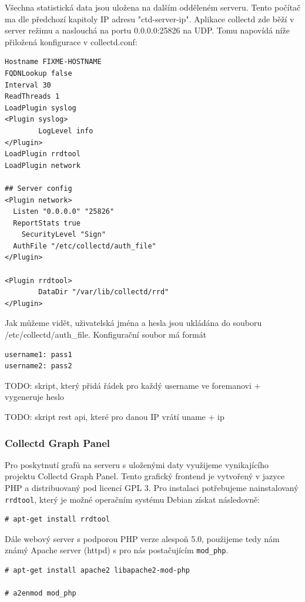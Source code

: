 \documentclass[thesis=B,czech]{FITthesis}[2012/06/26]
\begin{document}
Všechna statistická data jsou uložena na dalším odděleném serveru. Tento počítač ma dle předchozí kapitoly IP adresu "ctd-server-ip". Aplikace collectd zde běží v server režimu a naslouchá na portu 0.0.0.0:25826 na UDP. Tomu napovídá níže přiložená konfigurace v collectd.conf:

\begin{verbatim}
Hostname FIXME-HOSTNAME
FQDNLookup false
Interval 30
ReadThreads 1
LoadPlugin syslog
<Plugin syslog>
        LogLevel info
</Plugin>
LoadPlugin rrdtool
LoadPlugin network

## Server config
<Plugin network>
  Listen "0.0.0.0" "25826"
  ReportStats true
	SecurityLevel "Sign"
  AuthFile "/etc/collectd/auth_file"
</Plugin>

<Plugin rrdtool>
        DataDir "/var/lib/collectd/rrd"
</Plugin>
\end{verbatim}

Jak můžeme vidět, uživatelská jména a hesla jsou ukládána do souboru /etc/collectd/auth\_file. Konfigurační soubor má formát

\begin{verbatim}
username1: pass1
username2: pass2
\end{verbatim}

TODO: skript, který přidá řádek pro každý username ve foremanovi + vygeneruje heslo

TODO: skript rest api, které pro danou IP vrátí uname + ip

\subsubsection{Collectd Graph Panel}

Pro poskytnutí grafů na serveru s uloženými daty využijeme vynikajícího projektu Collectd Graph Panel. Tento grafický frontend je vytvořený v jazyce PHP a distribuovaný pod licencí GPL 3. Pro instalaci potřebujeme nainstalovaný \texttt{rrdtool}, který je možné operačním systému Debian získat následovně:
\begin{verbatim}
# apt-get install rrdtool
\end{verbatim}

Dále webový server s podporou PHP verze alespoň 5.0, použijeme tedy nám známý Apache server (httpd) s pro nás postačujícím \texttt{mod_php}.

\begin{verbatim}
# apt-get install apache2 libapache2-mod-php

# a2enmod mod_php
\end{verbatim}
\end{document}
